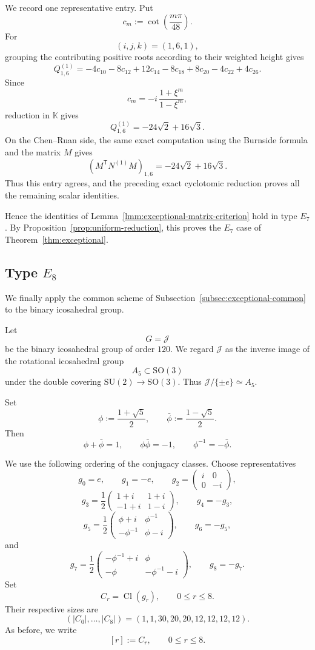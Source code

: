 \documentclass[a4paper,reqno]{amsart}
\theoremstyle{plain} %
\theoremstyle{definition} %
\theoremstyle{remark} %
\newcommand{\1}{\mathds{1}}   %
\begin{document}
We record one representative entry.  Put
\[
c_m
:=
\cot\left(\frac{m\pi}{48}\right).
\]
For
\[
(i,j,k)=(1,6,1),
\]
grouping the contributing positive roots according to their weighted
height gives
\[
Q_{1,6}^{(1)}
=
-4c_{10}-8c_{12}+12c_{14}-8c_{18}
+8c_{20}-4c_{22}+4c_{26}.
\]
Since
\[
c_m
=
-i\,\frac{1+\xi^m}{1-\xi^m},
\]
reduction in \(\mathbb K\) gives
\[
Q_{1,6}^{(1)}
=
-24\sqrt2+16\sqrt3.
\]
On the Chen--Ruan side, the same exact computation using the Burnside
formula and the matrix \(M\) gives
\[
\left(M^{\mathsf T}N^{(1)}M\right)_{1,6}
=
-24\sqrt2+16\sqrt3.
\]
Thus this entry agrees, and the preceding exact cyclotomic reduction
proves all the remaining scalar identities.

Hence the identities of
Lemma~\ref{lmm:exceptional-matrix-criterion} hold in type \(E_7\).
By Proposition~\ref{prop:uniform-reduction}, this proves the \(E_7\) case of
Theorem~\ref{thm:exceptional}.


\subsection{Type \(E_8\)}
\label{subsec:E8}

We finally apply the common scheme of
Subsection~\ref{subsec:exceptional-common} to the binary icosahedral
group.

Let
\[
G=\mathcal J
\]
be the binary icosahedral group of order \(120\).  We regard
\(\mathcal J\) as the inverse image of the rotational icosahedral group
\[
A_5\subset\mathrm{SO}(3)
\]
under the double covering $\mathrm{SU}(2)\longrightarrow\mathrm{SO}(3)$. 
Thus $\mathcal J/\{\pm e\}\simeq A_5$. 

Set
\[
\phi:=\frac{1+\sqrt5}{2},
\qquad
\bar\phi:=\frac{1-\sqrt5}{2}.
\]
Then
\[
\phi+\bar\phi=1,
\qquad
\phi\bar\phi=-1,
\qquad
\phi^{-1}=-\bar\phi.
\]

We use the following ordering of the conjugacy classes.  Choose
representatives
\[
g_0=e,
\qquad
g_1=-e,
\qquad
g_2=
\begin{pmatrix}
i&0\\
0&-i
\end{pmatrix},
\]
\[
g_3
=
\frac12
\begin{pmatrix}
1+i&1+i\\
-1+i&1-i
\end{pmatrix},
\qquad
g_4=-g_3,
\]
\[
g_5
=
\frac12
\begin{pmatrix}
\phi+i&\phi^{-1}\\
-\phi^{-1}&\phi-i
\end{pmatrix},
\qquad
g_6=-g_5,
\]
and
\[
g_7
=
\frac12
\begin{pmatrix}
-\phi^{-1}+i&\phi\\
-\phi&-\phi^{-1}-i
\end{pmatrix},
\qquad
g_8=-g_7.
\]
Set
\[
C_r=\operatorname{Cl}(g_r),
\qquad
0\le r\le8.
\]
Their respective sizes are
\[
(|C_0|,\ldots,|C_8|)
=
(1,1,30,20,20,12,12,12,12).
\]
As before, we write
\[
[r]:=C_r,
\qquad
0\le r\le8.
\]
\end{document}
